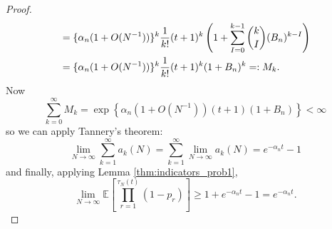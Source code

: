 \documentclass{article}
\newcommand{\Prob}{\mathbb{P}}
\newcommand{\E}{\mathbb{E}}
\newcommand{\I}[1]{\mathbbm{1}_{\{#1\}}}
\newcommand{\1}[1]{\mathbbm{1}_{#1}}
\begin{document}
\begin{proof}
\begin{align}
&= \{ \alpha_n (1+ O(N^{-1})) \}^k 
\frac{1}{k!} (t+1)^k \left( 1+\sum_{I=0}^{k-1} \binom{k}{I} (B_n)^{k-I} \right) \notag\\
&= \{ \alpha_n (1+ O(N^{-1})) \}^k \frac{1}{k!} (t+1)^k (1 + B_n)^k 
=: M_k .
\end{align}
Now
\begin{equation}
\sum_{k=0}^\infty M_k = \exp \left\{ \alpha_n (1+O(N^{-1})) (t+1) (1+B_n) \right\} < \infty
\end{equation}
so we can apply Tannery's theorem:
\begin{equation}\label{eq:26a}
\lim_{N\to\infty} \sum_{k=1}^\infty a_k(N)
= \sum_{k=1}^\infty \lim_{N\to\infty} a_k(N)
= e^{-\alpha_n t} -1
\end{equation}
and finally, applying Lemma \ref{thm:indicators_prob1},
\begin{equation}
\lim_{N\to\infty} \E \left[ \prod_{r=1}^{\tau_N(t)} (1-p_r) \right]
\geq 1 + e^{-\alpha_n t} -1 = e^{-\alpha_n t} .
\end{equation}



\end{proof}
\end{document}
